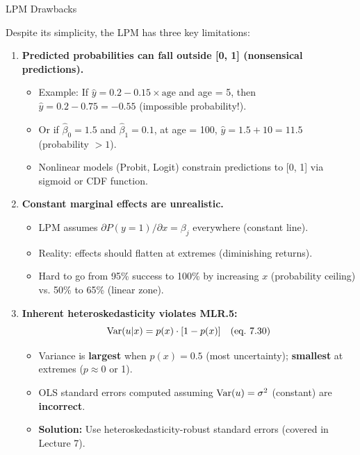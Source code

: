 \documentclass[aspectratio=169, 12pt]{beamer}
\begin{document}
\begin{frame}[shrink=20]{LPM Drawbacks}

  Despite its simplicity, the LPM has three key limitations:

  \medskip

  \begin{enumerate}
    \item \textbf{Predicted probabilities can fall outside [0, 1] (nonsensical predictions).}
    \begin{itemize}
      \item Example: If $\hat{y} = 0.2 - 0.15 \times \text{age}$ and age = 5, then $\hat{y} = 0.2 - 0.75 = -0.55$ (impossible probability!).
      \item Or if $\hat{\beta}_0 = 1.5$ and $\hat{\beta}_1 = 0.1$, at age = 100, $\hat{y} = 1.5 + 10 = 11.5$ (probability $> 1$).
      \item Nonlinear models (Probit, Logit) constrain predictions to [0, 1] via sigmoid or CDF function.
    \end{itemize}

    \vspace{0.3cm}

    \item \textbf{Constant marginal effects are unrealistic.}
    \begin{itemize}
      \item LPM assumes $\partial P(y=1) / \partial x = \beta_j$ everywhere (constant line).
      \item Reality: effects should flatten at extremes (diminishing returns).
      \item Hard to go from 95\% success to 100\% by increasing $x$ (probability ceiling) vs. 50\% to 65\% (linear zone).
    \end{itemize}

    \vspace{0.3cm}

    \item \textbf{Inherent heteroskedasticity violates MLR.5:}
    \[
      \operatorname{Var}(u | x) = p(x) \cdot [1 - p(x)] \quad \text{(eq.\ 7.30)}
    \]
    \begin{itemize}
      \item Variance is \textbf{largest} when $p(x) = 0.5$ (most uncertainty); \textbf{smallest} at extremes ($p \approx 0$ or 1).
      \item OLS standard errors computed assuming $\operatorname{Var}(u) = \sigma^2$ (constant) are \textbf{incorrect}.
      \item \textbf{Solution:} Use heteroskedasticity-robust standard errors (covered in Lecture 7).
    \end{itemize}
  \end{enumerate}

\end{frame}
\end{document}
